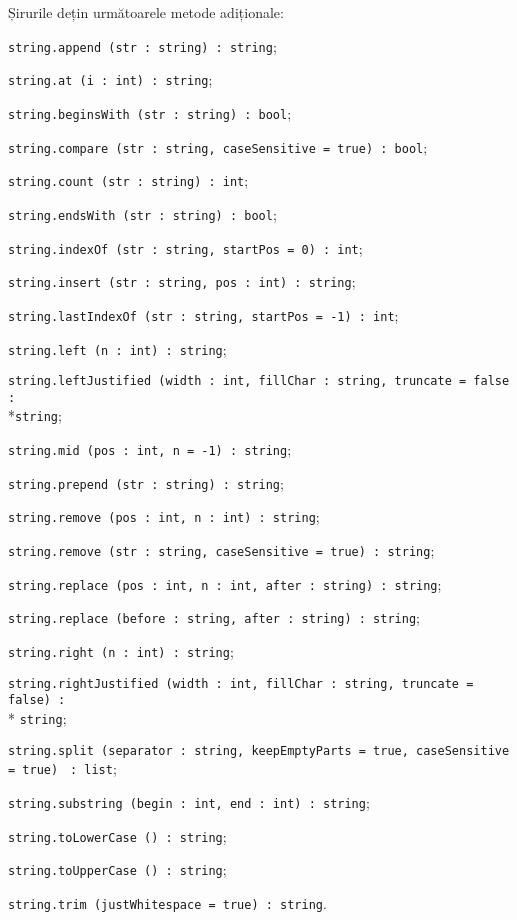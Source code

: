 Șirurile dețin următoarele metode adiționale:
\begin{icItems}
	\item \texttt{string.append (str : string) : string};
	\item \texttt{string.at (i : int) : string};
	\item \texttt{string.beginsWith (str : string) : bool};
	\item \texttt{string.compare (str : string, caseSensitive = true) : bool};
	\item \texttt{string.count (str : string) : int};
	\item \texttt{string.endsWith (str : string) : bool};
	\item \texttt{string.indexOf (str : string, startPos = 0) : int};
	\item \texttt{string.insert (str : string, pos : int) : string};
	\item
	\texttt{string.lastIndexOf (str : string, startPos = -1) : int};
	\item \texttt{string.left (n : int) : string};
	\item \texttt{string.leftJustified (width : int, fillChar : string, truncate = false :}\\*\texttt{string};
	\item \texttt{string.mid (pos : int, n = -1) : string};
	\item \texttt{string.prepend (str : string) : string};
	\item \texttt{string.remove (pos : int, n : int) : string};
	\item \texttt{string.remove (str : string, caseSensitive = true) : string};
	\item \texttt{string.replace (pos : int, n : int, after : string) : string};
	\item \texttt{string.replace (before : string, after : string) : string};
	\item \texttt{string.right (n : int) : string};
	\item \texttt{string.rightJustified (width : int, fillChar : string, truncate = false) :}\\* \texttt{string};
	\item \texttt{string.split (separator : string, keepEmptyParts = true, caseSensitive = true) } \texttt{: list};
	\item \texttt{string.substring (begin : int, end : int) : string};
	\item \texttt{string.toLowerCase () : string};
	\item \texttt{string.toUpperCase () : string};
	\item \texttt{string.trim (justWhitespace = true) : string}.
\end{icItems}

